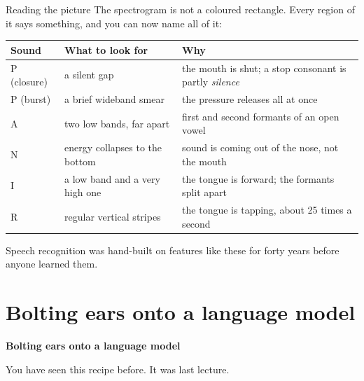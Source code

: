\documentclass[aspectratio=169]{beamer}
\begin{document}
\begin{frame}{Reading the picture}
  \small
  The spectrogram is not a coloured rectangle. Every region of it says something, and you can
  now name all of it:
  \vskip 6pt
  \begin{center}
    \footnotesize
    \begin{tabular}{llp{5.6cm}}
      \toprule
      \textbf{Sound} & \textbf{What to look for} & \textbf{Why} \\
      \midrule
      P (closure) & a silent gap & the mouth is shut; a stop consonant is partly \emph{silence} \\
      P (burst) & a brief wideband smear & the pressure releases all at once \\
      A & two low bands, far apart & first and second formants of an open vowel \\
      N & energy collapses to the bottom & sound is coming out of the nose, not the mouth \\
      I & a low band and a very high one & the tongue is forward; the formants split apart \\
      \rowcolor{armorange!14}
      R & regular vertical stripes & the tongue is tapping, about 25 times a second \\
      \bottomrule
    \end{tabular}
  \end{center}
  \vskip 6pt
  \centering
  Speech recognition was hand-built on features like these for forty years before anyone
  learned them.
\end{frame}

\section{Bolting ears onto a language model}

\begin{frame}[plain]
  \vfill
  \begin{center}
    {\Large\color{popblue}\textbf{Bolting ears onto a language model}}\\[0.9em]
    \begin{minipage}{0.82\textwidth}\centering\small
      You have seen this recipe before. It was last lecture.
    \end{minipage}
  \end{center}
  \vfill
\end{frame}
\end{document}
